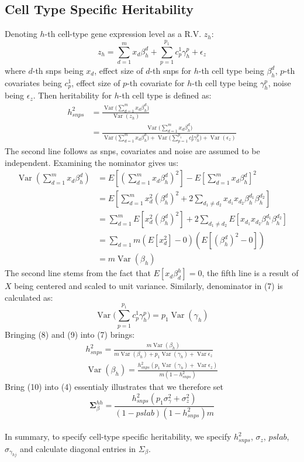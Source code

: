 \documentclass{article}
\newcommand{\matr}[1]{\mathbf{#1}}
\DeclareMathOperator{\Var}{Var}
\begin{document}
\subsection{Cell Type Specific Heritability}
Denoting $h$-th cell-type gene expression level as a R.V. $z_h$:
\begin{equation}
    z_h=\sum_{d=1}^{m}x_d\beta^d_h+\sum_{p=1}^{p_1}c^1_p\gamma^p_h +\epsilon_z
\end{equation}
where $d$-th snps being $x_d$, effect size of $d$-th snps for $h$-th cell type being $\beta^d_h$, $p$-th covariates being $c^1_p$, effect size of $p$-th covariate for $h$-th cell type being $\gamma^p_h$, noise being $\epsilon_z$. Then heritability for $h$-th cell type is defined as:
\begin{align}
    h^2_{snps} &= \frac{\Var{(\sum_{d=1}^{m}x_d\beta^{d}_{h}})}{\Var{(z_h)}}\\
    &= \frac{\Var{(\sum_{d=1}^{m}x_d\beta^{d}_{h}})}{\Var{(\sum_{d=1}^{m}x_d\beta^{d}_{h}})+\Var{(\sum_{p=1}^{p_1}c^1_p\gamma^{p}_{h}})+\Var{(\epsilon_z)}} \nonumber
\end{align}
The second line follows as snps, covariates and noise are assumed to be independent. Examining the nominator gives us:
\begin{align}
    \Var{(\sum_{d=1}^{m}x_d\beta^{d}_{h})}&=
    E[(\sum_{d=1}^{m}x_d\beta^{d}_{h})^2]-E[\sum_{d=1}^{m}x_d\beta^{d}_{h}]^2 \nonumber\\
    &= E[\sum_{d=1}^{m}x_d^2(\beta_h^d)^2+2\sum_{d_1\neq d_2}x_{d_1}x_{d_2}\beta^{d_1}_{h}\beta^{d_2}_{h}] \nonumber\\
    &= \sum_{d=1}^{m}E[x_d^2(\beta_h^d)^2]+2\sum_{d_1\neq d_2}E[x_{d_1}x_{d_2}\beta^{d_1}_{h}\beta^{d_2}_{h}] \nonumber\\
    &= \sum_{d=1}{m}(E[x_d^2]-0)(E[(\beta^d_h)^2-0]) \nonumber\\
    &= m\Var{(\beta_h)}
\end{align}
The second line stems from the fact that $E[x_d\beta^h_d]=0$, the fifth line is a result of $X$ being centered and scaled to unit variance. Similarly, denominator in (7) is calculated as:
\begin{equation}
    \Var{(\sum_{p=1}^{p_1}c^1_p\gamma^{p}_{h}}) =
    p_1\Var{(\gamma_h)}
\end{equation}
Bringing (8) and (9) into (7) brings:
\begin{gather}
    h^2_{snps} = \frac{m\Var{(\beta_h)}}{m\Var{(\beta_h)}+p_1\Var{(\gamma_h)}+\Var{\epsilon_z}} \nonumber\\
    \Var{(\beta_h)} = \frac{h^2_{snps}(p_1\Var{(\gamma_h)}+\Var{\epsilon_z})}{m(1-h^2_{snps})}
\end{gather}
Bring (10) into (4) essentialy illustrates that
we therefore set
\begin{equation}
    \matr{\Sigma}^{hh}_{\beta} = \frac{h^2_{snps}(p_1\sigma^2_{\gamma}+\sigma^2_z)}{(1-pslab)(1-h^2_{snps})m}
\end{equation}
\\
In summary, to specify cell-type specific heritability, we specify $h^2_{snps}$, $\sigma_z$, $pslab$, $\sigma_{\gamma_{hj}}$ and calculate diagonal entries in $\Sigma_{\beta}$.
\end{document}
